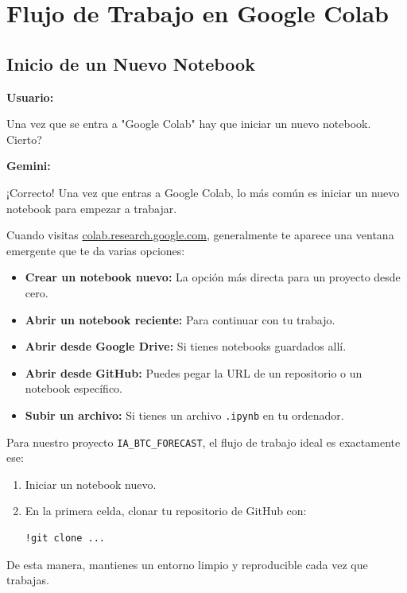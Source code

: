 \documentclass[12pt, a4paper]{article}
\newenvironment{usuario}{\par\noindent\textbf{Usuario:}\itshape\par\ignorespaces}{\par}
\newenvironment{gemini}{\par\noindent\textbf{Gemini:}\par\ignorespaces}{\par}
\begin{document}
\section{Flujo de Trabajo en Google Colab}

\subsection{Inicio de un Nuevo Notebook}

\begin{usuario}
Una vez que se entra a "Google Colab" hay que 
iniciar un nuevo notebook. Cierto?
\end{usuario}

\begin{gemini}
¡Correcto! Una vez que entras a Google Colab, lo más común es 
iniciar un nuevo notebook para empezar a trabajar.

Cuando visitas \href{https://colab.research.google.com}{colab.research.google.com}, generalmente te aparece una ventana emergente que te da varias opciones:
\begin{itemize}
    \item \textbf{Crear un notebook nuevo:} La opción más directa para un proyecto desde cero.
    \item \textbf{Abrir un notebook reciente:} Para continuar con tu trabajo.
    \item \textbf{Abrir desde Google Drive:} Si tienes notebooks guardados allí.
    \item \textbf{Abrir desde GitHub:} Puedes pegar la URL de un repositorio o un notebook específico.
    \item \textbf{Subir un archivo:} Si tienes un archivo \texttt{.ipynb} en tu ordenador.
\end{itemize}

Para nuestro proyecto \texttt{IA\_BTC\_FORECAST}, el flujo de trabajo ideal es exactamente ese:
\begin{enumerate}
    \item Iniciar un notebook nuevo.
    \item En la primera celda, clonar tu repositorio de GitHub con:
    \begin{lstlisting}[language=bash] !git clone ...
    \end{lstlisting}
\end{enumerate}

De esta manera, mantienes un entorno limpio y reproducible cada vez que trabajas.
\end{gemini}
\end{document}
